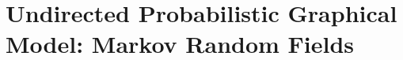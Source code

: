 \documentclass{StyFiles/usydthesis}
\begin{document}
\part{Undirected Probabilistic Graphical Model: Markov Random
  Fields}
\label{part:2}



% 



% 





\printindex
\end{document}
